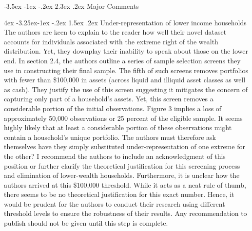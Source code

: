 \documentclass[]{article}
\makeatletter
\newcommand{\bb}{\bigbreak\noindent}
\renewcommand\section{\leftskip 0pt\@startsection {section}{1}{\z@}%
	{-3.5ex \@plus -1ex \@minus -.2ex}%
	{2.3ex \@plus.2ex}%
	{\normalfont\Large\bfseries}}
\renewcommand\subsection{\leftskip 4ex\@startsection{subsection}{2}{\z@}%
	{-3.25ex\@plus -1ex \@minus -.2ex}%
	{1.5ex \@plus .2ex}%
	{\normalfont\large\bfseries}}
\makeatother
\begin{document}
\begin{spacing}{1.25}
\section{Major Comments}


\subsection{Under-representation of lower income households}
The authors are keen to explain to the reader how well their novel dataset accounts for individuals associated with the extreme right of the wealth distribution. Yet, they downplay their inability to speak about those on the lower end. 
In section 2.4, the authors outline a series of sample selection screens they use in constructing their final sample. The fifth of such screens removes portfolios with fewer than \$100,000 in assets (across liquid and illiquid asset classes as well as cash). They justify the use of this screen suggesting it mitigates the concern of capturing only part of a household's assets. Yet, this screen removes a considerable portion of the initial observations. Figure 3 implies a loss of approximately 50,000 observations or 25 percent of the eligible sample. It seems highly likely that at least a considerable portion of these observations might contain a household's unique portfolio. The authors must therefore ask themselves have they simply substituted under-representation of one extreme for the other? I recommend the authors to include an acknowledgment of this position or further clarify the theoretical justification for this screening process and elimination of lower-wealth households. 
\bb
Furthermore, it is unclear how the authors arrived at this \$100,000 threshold. While it acts as a neat rule of thumb, 
there seems to be no theoretical justification for this exact number. Hence, it would be prudent for the authors to conduct their research using different threshold levels to ensure the robustness of their results. Any recommendation to publish should not be given until this step is complete.

	
	

\end{spacing}
\end{document}

